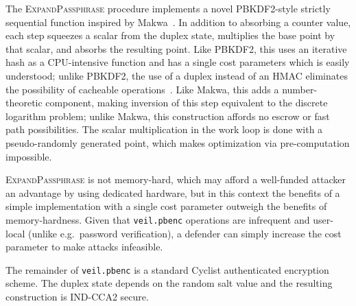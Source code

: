 The \textsc{ExpandPassphrase} procedure implements a novel PBKDF2-style strictly sequential function inspired by
Makwa~\cite{rfc2898, pornin2015}\@.
In addition to absorbing a counter value, each step squeezes a scalar from the duplex state, multiplies the base point
by that scalar, and absorbs the resulting point.
Like PBKDF2, this uses an iterative hash as a CPU-intensive function and has a single cost parameters which is easily
understood;
unlike PBKDF2, the use of a duplex instead of an HMAC eliminates the possibility of cacheable
operations~\cite{visconti2015}\@.
Like Makwa, this adds a number-theoretic component, making inversion of this step equivalent to the discrete logarithm
problem;
unlike Makwa, this construction affords no escrow or fast path possibilities.
The scalar multiplication in the work loop is done with a pseudo-randomly generated point, which makes optimization via
pre-computation impossible.

\textsc{ExpandPassphrase} is not memory-hard, which may afford a well-funded attacker an advantage by using dedicated
hardware, but in this context the benefits of a simple implementation with a single cost parameter outweigh the benefits
of memory-hardness.
Given that \texttt{veil.pbenc} operations are infrequent and user-local (unlike e.g.\ password verification), a defender
can simply increase the cost parameter to make attacks infeasible.

The remainder of \texttt{veil.pbenc} is a standard Cyclist authenticated encryption scheme.
The duplex state depends on the random salt value and the resulting construction is IND-CCA2 secure.
